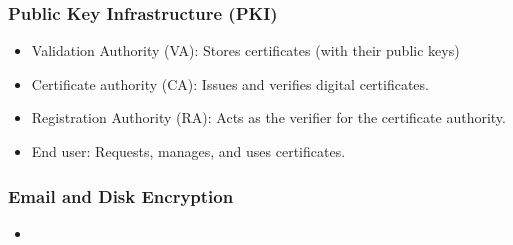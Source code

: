\subsubsection{Public Key Infrastructure (PKI)}
\begin{itemize}
    \item Validation Authority (VA): Stores certificates (with their public keys)
    \item Certificate authority (CA): Issues and verifies digital certificates.
    \item Registration Authority (RA): Acts as the verifier for the certificate authority.
    \item End user: Requests, manages, and uses certificates.
\end{itemize}
\subsubsection{Email and Disk Encryption}
\begin{itemize}
    \item 
\end{itemize}
